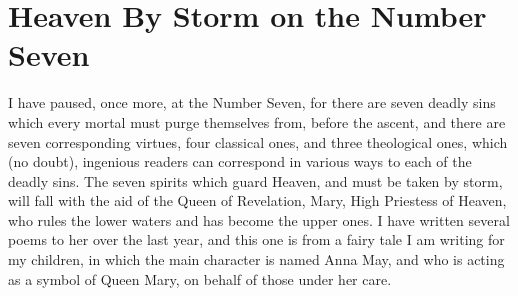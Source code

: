 \section{Heaven By Storm on the Number Seven}

I have paused, once more, at the Number Seven, for there are seven deadly sins which every mortal must purge themselves from, before the ascent, and there are seven corresponding virtues, four classical ones, and three theological ones, which (no doubt), ingenious readers can correspond in various ways to each of the deadly sins. The seven spirits which guard Heaven, and must be taken by storm, will fall with the aid of the Queen of Revelation, Mary, High Priestess of Heaven, who rules the lower waters and has become the upper ones. I have written several poems to her over the last year, and this one is from a fairy tale I am writing for my children, in which the main character is named Anna May, and who is acting as a symbol of Queen Mary, on behalf of those under her care.

